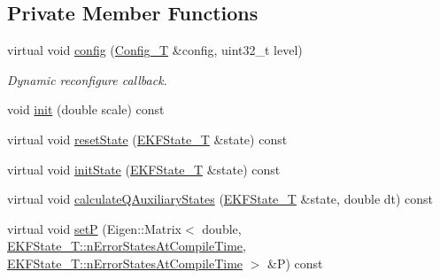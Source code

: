 \subsection*{Private Member Functions}
\begin{DoxyCompactItemize}
\item 
virtual void \hyperlink{classmsf__pose__pressure__sensor_1_1PosePressureSensorManager_a667887475988136054354f19304d9440}{config} (\hyperlink{namespacemsf__pose__pressure__sensor_a2c4cfe42f9dab2046f445854ea6e36b8}{Config\-\_\-\-T} \&config, uint32\-\_\-t level)
\begin{DoxyCompactList}\small\item\em Dynamic reconfigure callback. \end{DoxyCompactList}\item 
void \hyperlink{classmsf__pose__pressure__sensor_1_1PosePressureSensorManager_aed12fe6a8adb28843c04606d2177f293}{init} (double scale) const 
\item 
virtual void \hyperlink{classmsf__pose__pressure__sensor_1_1PosePressureSensorManager_af0dc71a3c6cf081bc3ac207cbaa6db30}{reset\-State} (\hyperlink{classmsf__pose__pressure__sensor_1_1PosePressureSensorManager_aa1bbb3e013d34230c78f161de7a0982f}{E\-K\-F\-State\-\_\-\-T} \&state) const 
\item 
virtual void \hyperlink{classmsf__pose__pressure__sensor_1_1PosePressureSensorManager_a5912e699266e4d66cdfa6a899c23ad93}{init\-State} (\hyperlink{classmsf__pose__pressure__sensor_1_1PosePressureSensorManager_aa1bbb3e013d34230c78f161de7a0982f}{E\-K\-F\-State\-\_\-\-T} \&state) const 
\item 
virtual void \hyperlink{classmsf__pose__pressure__sensor_1_1PosePressureSensorManager_a76577bdeb8f0836c73c6e2c577ef6fe9}{calculate\-Q\-Auxiliary\-States} (\hyperlink{classmsf__pose__pressure__sensor_1_1PosePressureSensorManager_aa1bbb3e013d34230c78f161de7a0982f}{E\-K\-F\-State\-\_\-\-T} \&state, double dt) const 
\item 
virtual void \hyperlink{classmsf__pose__pressure__sensor_1_1PosePressureSensorManager_a9b3b2fe30cde9a2877b37c111c5b42a3}{set\-P} (Eigen\-::\-Matrix$<$ double, \hyperlink{structmsf__core_1_1GenericState__T_a20545d9aacd8f84bc1a97a873310cd5fab0136c5805e4e8d75677885fcaad5901}{E\-K\-F\-State\-\_\-\-T\-::n\-Error\-States\-At\-Compile\-Time}, \hyperlink{structmsf__core_1_1GenericState__T_a20545d9aacd8f84bc1a97a873310cd5fab0136c5805e4e8d75677885fcaad5901}{E\-K\-F\-State\-\_\-\-T\-::n\-Error\-States\-At\-Compile\-Time} $>$ \&P) const 
\item 

\end{DoxyCompactItemize}
